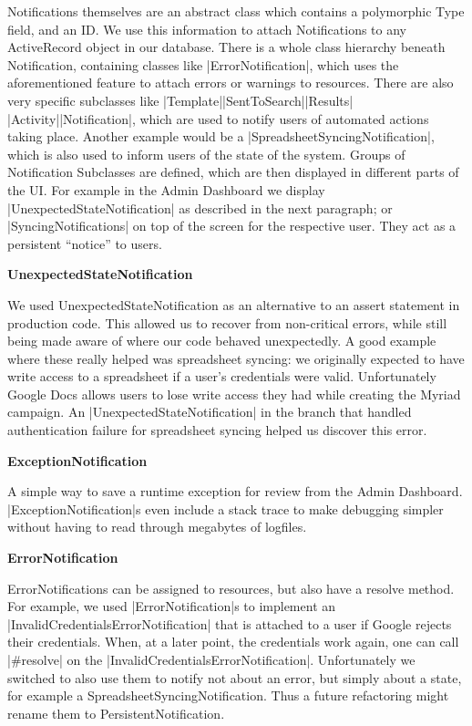 Notifications themselves are an abstract class which contains a polymorphic Type field, and an ID. We use this information to attach Notifications to any ActiveRecord object in our database. There is a whole class hierarchy beneath Notification, containing classes like |ErrorNotification|, which uses the aforementioned feature to attach errors or warnings to resources. There are also very specific subclasses like |Template||SentToSearch||Results| |Activity||Notification|, which are used to notify users of automated actions taking place. Another example would be a |SpreadsheetSyncingNotification|, which is also used to inform users of the state of the system. Groups of Notification Subclasses are defined, which are then displayed in different parts of the UI. For example in the Admin Dashboard we display |UnexpectedStateNotification| as described in the next paragraph; or |SyncingNotifications| on top of the screen for the respective user. They act as a persistent ``notice'' to users.

\textbf{UnexpectedStateNotification}

We used UnexpectedStateNotification as an alternative to an assert statement in production code. This allowed us to recover from non-critical errors, while still being made aware of where our code behaved unexpectedly. A good example where these really helped was spreadsheet syncing: we originally expected to have write access to a spreadsheet if a user's credentials were valid. Unfortunately Google Docs allows users to lose write access they had while creating the Myriad campaign. An |UnexpectedStateNotification| in the branch that handled authentication failure for spreadsheet syncing helped us discover this error.

\textbf{ExceptionNotification}

A simple way to save a runtime exception for review from the Admin Dashboard. |ExceptionNotification|s even include a stack trace to make debugging simpler without having to read through megabytes of logfiles.

\textbf{ErrorNotification}

ErrorNotifications can be assigned to resources, but also have a resolve method. For example, we used |ErrorNotification|s to implement an |InvalidCredentialsErrorNotification| that is attached to a user if Google rejects their credentials. When, at a later point, the credentials work again, one can call |#resolve| on the |InvalidCredentialsErrorNotification|.
Unfortunately we switched to also use them to notify not about an error, but simply about a state, for example a SpreadsheetSyncingNotification. Thus a future refactoring might rename them to PersistentNotification.

